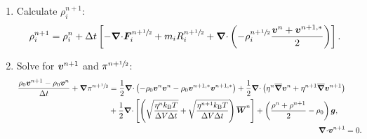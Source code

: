 \documentclass[
10pt
showpacs, showkeys,
amsmath,amssymb,
aps,
pre,
floatfix,
]{revtex4-1}
\newcommand{\divg}{{\V\nabla\cdot}}                       %
\begin{document}
\begin{enumerate}
\item Calculate $\rho^{n+1}_i$:
\begin{equation}
\rho^{n+1}_i = \rho^n_i + \D{t} \left[ -\divg\V{F}^{n+\myhalf}_i + m_i R^{n+\myhalf}_i 
+ \divg\left( -\rho^{n+\myhalf}_i \frac{\V{v}^n + \V{v}^{n+1,*}}{2} \right) \right].
\end{equation} 

\item Solve for $\boldsymbol{v}^{n+1}$ and $\pi^{n+\sfrac{1}{2}}$:
\begin{align}
\label{boussinesq_stokes_v_2nd}
\begin{split}
\frac{\rho_0\V{v}^{n+1}-\rho_0\V{v}^n}{\D{t}} + \grad\pi^{n+\myhalf}
&= \frac{1}{2}\divg\left(-\rho_0\V{v}^n\V{v}^n-\rho_0\V{v}^{n+1,*}\V{v}^{n+1,*}\right) 
+ \frac{1}{2}\divg\left( \eta^n \overline{\grad}\V{v}^n + \eta^{n+1} \overline{\grad}\V{v}^{n+1} \right) \\
&+ \frac{1}{2}\divg\left[\left( \sqrt{\frac{\eta^n k_\mathrm{B}T}{\D{V}\D{t}}} + \sqrt{\frac{\eta^{n+1} k_\mathrm{B}T}{\D{V}\D{t}}} \right) \overline{\V{W}}^n \right]
+ \left(\frac{\rho^n+\rho^{n+1}}{2}-\rho_0\right)\V{g},
\end{split} \\
\label{boussinesq_stokes_p_2nd}
\divg\V{v}^{n+1} & = 0.
\end{align}

\end{enumerate}
\end{document}
